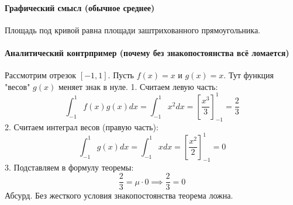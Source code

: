 \paragraph{Графический смысл (обычное среднее)}
Площадь под кривой равна площади заштрихованного прямоугольника.
\begin{center}
\end{center}

\paragraph{Аналитический контрпример (почему без знакопостоянства всё ломается)}
Рассмотрим отрезок $[-1, 1]$. Пусть $f(x) = x$ и $g(x) = x$. 
Тут функция "весов" $g(x)$ меняет знак в нуле.
1. Считаем левую часть:
$$ \int_{-1}^{1} f(x)g(x)dx = \int_{-1}^{1} x^2 dx = \left[ \frac{x^3}{3} \right]_{-1}^{1} = \frac{2}{3} $$
2. Считаем интеграл весов (правую часть):
$$ \int_{-1}^{1} g(x)dx = \int_{-1}^{1} x dx = \left[ \frac{x^2}{2} \right]_{-1}^{1} = 0 $$
3. Подставляем в формулу теоремы:
$$ \frac{2}{3} = \mu \cdot 0 \implies \frac{2}{3} = 0 $$
Абсурд. Без жесткого условия знакопостоянства теорема ложна.